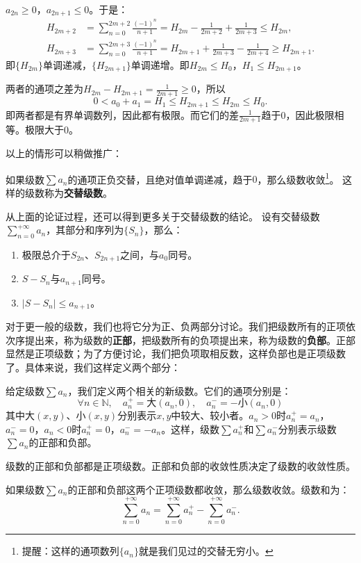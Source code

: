 \documentclass[12pt,UTF8]{ctexbook}
\begin{document}
$a_{2n} \geqslant 0$，$a_{2n+1} \leqslant 0$。于是：
\begin{align*}
    H_{2m+2} &= \sum_{n=0}^{2m+2} \frac{(-1)^{n}}{n+1} = H_{2m} - \frac{1}{2m+2} + \frac{1}{2m+3} \leqslant H_{2m},  \\
    H_{2m+3} &= \sum_{n=0}^{2m+3} \frac{(-1)^{n}}{n+1} = H_{2m+1} + \frac{1}{2m+3} - \frac{1}{2m+4} \geqslant H_{2m+1}. 
\end{align*}
即$\{H_{2m}\}$单调递减，$\{H_{2m+1}\}$单调递增。即$H_{2m} \leqslant H_0 $，$H_1\leqslant H_{2m+1}$。

两者的通项之差为$ H_{2m} - H_{2m+1} = \frac{1}{2m+1} \geqslant 0$，所以
$$ 0 < a_0 + a_1 = H_1 \leqslant H_{2m+1} \leqslant H_{2m} \leqslant H_0. $$
即两者都是有界单调数列，因此都有极限。而它们的差$\frac{1}{2m+1}$趋于$0$，因此极限相等。极限大于$0$。

以上的情形可以稍做推广：
\begin{tm}
    如果级数$\sum a_n$的通项正负交替，且绝对值单调递减，趋于$0$，那么级数收敛\footnote{提醒：这样的通项数列$\{a_n\}$就是我们见过的交替无穷小。}。
    这样的级数称为\textbf{交替级数}。
\end{tm}

从上面的论证过程，还可以得到更多关于交替级数的结论。
设有交替级数$\sum_{n=0}^{+\infty} a_n$，其部分和序列为$\{S_{n}\}$，那么：
\begin{enumerate}
    \item 极限总介于$S_{2n}$、$S_{2n+1}$之间，与$a_0$同号。
    \item $S - S_n$与$a_{n+1}$同号。
    \item $|S - S_n|\leqslant a_{n+1}$。
\end{enumerate}

对于更一般的级数，我们也将它分为正、负两部分讨论。我们把级数所有的正项依次序提出来，称为级数的\textbf{正部}，把级数所有的负项提出来，称为级数的\textbf{负部}。正部显然是正项级数；为了方便讨论，我们把负项取相反数，这样负部也是正项级数了。具体来说，我们这样定义两个部分：
\begin{df}
    给定级数$\sum a_n$，我们定义两个相关的新级数。它们的通项分别是：
    $$ \forall n \in \mathbb{N}, \quad a_n^+ = \text{大}(a_n, 0), \quad a_n^- = -\text{小}(a_n, 0) $$
    其中$\text{大}(x, y)$、$\text{小}(x, y)$分别表示$x,y$中较大、较小者。$a_n>0$时$a_n^+=a_n$，$a_n^-=0$，$a_n<0$时$a_n^+=0$，$a_n^- = -a_n$。这样，级数$\sum a_n^+$和$\sum a_n^-$分别表示级数$\sum a_n$的正部和负部。
\end{df}

级数的正部和负部都是正项级数。正部和负部的收敛性质决定了级数的收敛性质。
\begin{tm}
    如果级数$\sum a_n$的正部和负部这两个正项级数都收敛，那么级数收敛。级数和为：
    $$\sum_{n=0}^{+\infty} a_n = \sum_{n=0}^{+\infty} a_n^+ - \sum_{n=0}^{+\infty} a_n^-.$$    
\end{tm}
\end{document}
